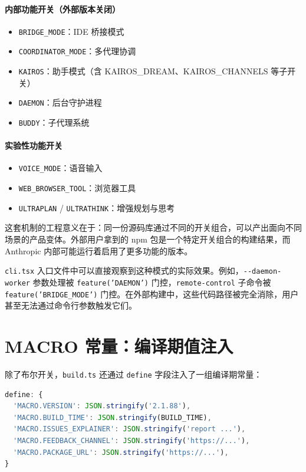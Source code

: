 \paragraph{内部功能开关（外部版本关闭）}

\begin{itemize}
  \item \texttt{BRIDGE\_MODE}：IDE 桥接模式
  \item \texttt{COORDINATOR\_MODE}：多代理协调
  \item \texttt{KAIROS}：助手模式（含 KAIROS\_DREAM、KAIROS\_CHANNELS 等子开关）
  \item \texttt{DAEMON}：后台守护进程
  \item \texttt{BUDDY}：子代理系统
\end{itemize}

\paragraph{实验性功能开关}

\begin{itemize}
  \item \texttt{VOICE\_MODE}：语音输入
  \item \texttt{WEB\_BROWSER\_TOOL}：浏览器工具
  \item \texttt{ULTRAPLAN} / \texttt{ULTRATHINK}：增强规划与思考
\end{itemize}

这套机制的工程意义在于：同一份源码库通过不同的开关组合，可以产出面向不同场景的产品变体。外部用户拿到的 npm 包是一个特定开关组合的构建结果，而 Anthropic 内部可能运行着启用了更多功能的版本。

\texttt{cli.tsx} 入口文件中可以直接观察到这种模式的实际效果。例如，\texttt{-{}-daemon-worker} 参数处理被 \texttt{feature('DAEMON')} 门控，\texttt{remote-control} 子命令被 \texttt{feature('BRIDGE\_MODE')} 门控。在外部构建中，这些代码路径被完全消除，用户甚至无法通过命令行参数触发它们。

\section{MACRO 常量：编译期值注入}

除了布尔开关，\texttt{build.ts} 还通过 \texttt{define} 字段注入了一组编译期常量：

\begin{lstlisting}[language=TypeScript]
define: {
  'MACRO.VERSION': JSON.stringify('2.1.88'),
  'MACRO.BUILD_TIME': JSON.stringify(BUILD_TIME),
  'MACRO.ISSUES_EXPLAINER': JSON.stringify('report ...'),
  'MACRO.FEEDBACK_CHANNEL': JSON.stringify('https://...'),
  'MACRO.PACKAGE_URL': JSON.stringify('https://...'),
}
\end{lstlisting}

